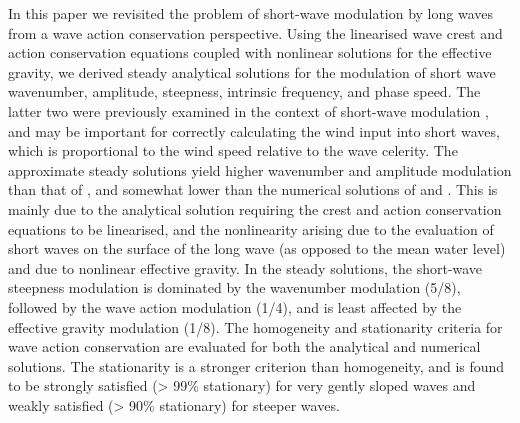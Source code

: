 \documentclass[lineno]{jfm}
\begin{document}
In this paper we revisited the problem of short-wave modulation by long waves
from a wave action conservation perspective.
Using the linearised wave crest and action conservation equations coupled with
nonlinear solutions for the effective gravity, we derived steady analytical
solutions for the modulation of short wave wavenumber, amplitude, steepness,
intrinsic frequency, and phase speed.
The latter two were previously examined in the context of short-wave
modulation \citep{longuet1962resonant,longuet1962phase}, and may be important
for correctly calculating the wind input into short waves, which is proportional
to the wind speed relative to the wave celerity.
The approximate steady solutions yield higher wavenumber and amplitude
modulation than that of \citet{longuet1960changes}, and somewhat lower than 
the numerical solutions of \citet{longuet1987propagation} and
\citet{zhang1990evolution}.
This is mainly due to the analytical solution requiring the crest and action
conservation equations to be linearised, and the nonlinearity arising due
to the evaluation of short waves on the surface of the long wave (as opposed to
the mean water level) and due to nonlinear effective gravity.
In the steady solutions, the short-wave steepness modulation is dominated by
the wavenumber modulation (5/8), followed by the wave action modulation (1/4),
and is least affected by the effective gravity modulation (1/8).
The homogeneity and stationarity criteria for wave action conservation are
evaluated for both the analytical and numerical solutions.
The stationarity is a stronger criterion than homogeneity, and is found to be
strongly satisfied (> 99\% stationary) for very gently sloped waves and weakly
satisfied (> 90\% stationary) for steeper waves.
\end{document}
